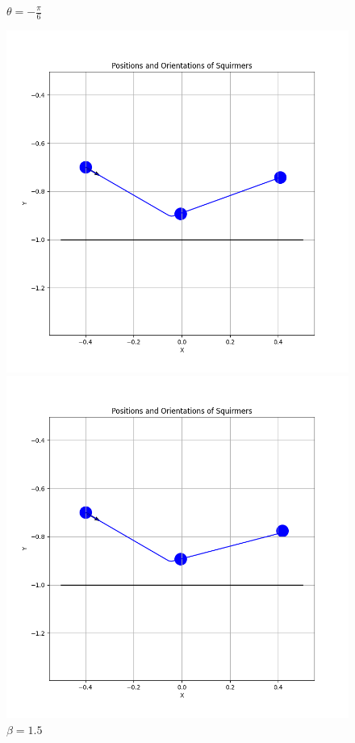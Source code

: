 \documentclass{article}
\begin{document}
 \begin{figure}[H]
    \centering
    \textbf{$\theta = -\frac{\pi}{6}$}\par\medskip
    \begin{minipage}{0.49\textwidth}
        \includegraphics[width=1.1\textwidth]{graphs/simulations/border/beta1_5/mpi_6.png}
        \caption{\footnotesize $\beta = 1.5$}
    \end{minipage}\hfill
    \begin{minipage}{0.49\textwidth}
        \includegraphics[width=1.1\textwidth]{graphs/simulations/border/beta3/mpi_6.png}

\end{minipage}
\end{figure}
\end{document}
